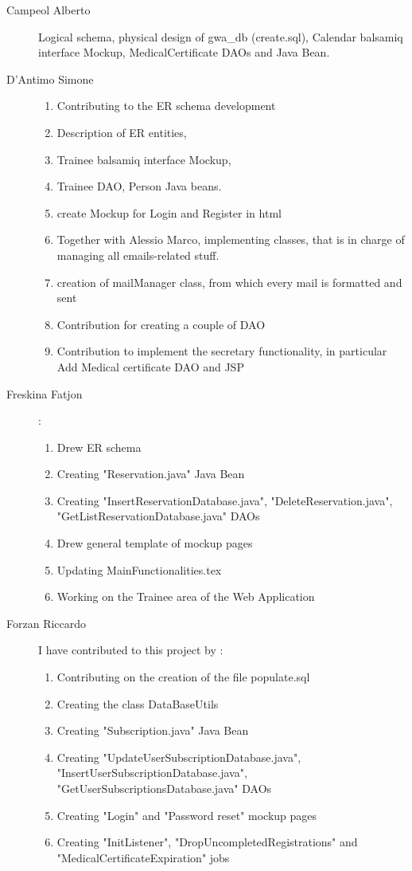\begin{description}
	\item[Campeol Alberto] Logical schema, physical design of gwa\_db (create.sql), Calendar balsamiq interface Mockup, MedicalCertificate DAOs and Java Bean.
	\item[D'Antimo Simone] 
	\begin{enumerate}
		\item Contributing to the ER schema development
		\item Description of ER entities,
		\item Trainee balsamiq interface Mockup,
		\item Trainee DAO, Person Java beans.
		\item create Mockup for Login and Register in html
		\item Together with Alessio Marco, implementing classes, that is in charge of managing all emails-related stuff.
		\item creation of mailManager class, from which every mail is formatted and sent
	    \item Contribution for creating a couple of DAO
	    \item Contribution to implement the secretary functionality, in particular Add Medical certificate DAO and JSP
	\end{enumerate}
	\item[Freskina Fatjon] :
	\begin{enumerate}
		\item Drew ER schema 
		\item Creating "Reservation.java" Java Bean 
		\item Creating "InsertReservationDatabase.java", "DeleteReservation.java", "GetListReservationDatabase.java" DAOs
		\item Drew general template of mockup pages 
		\item Updating MainFunctionalities.tex
		\item Working on the Trainee area of the Web Application
	\end{enumerate} 
	
	\item[Forzan Riccardo] I have contributed to this project by :
	\begin{enumerate}
		\item Contributing on the creation of the file populate.sql
		\item Creating the class DataBaseUtils
		\item Creating "Subscription.java" Java Bean
		\item Creating "UpdateUserSubscriptionDatabase.java", "InsertUserSubscriptionDatabase.java", "GetUserSubscriptionsDatabase.java" DAOs
		\item Creating "Login" and "Password reset" mockup pages
		\item Creating "InitListener", "DropUncompletedRegistrations" and "MedicalCertificateExpiration" jobs
	\end{enumerate}
	

\end{description}

